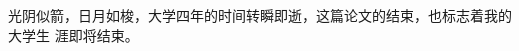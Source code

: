 \pagestyle{thanks}
\begin{thankpage}

光阴似箭，日月如梭，大学四年的时间转瞬即逝，这篇论文的结束，也标志着我的大学生
涯即将结束。
\end{thankpage}